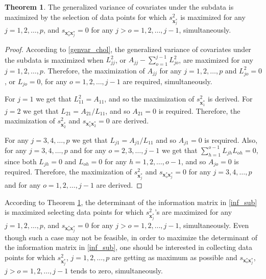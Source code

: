 \documentclass[12pt]{article}
\theoremstyle{definition}
\newtheorem{theorem}{Theorem}[section]
\begin{document}
	\begin{theorem}\label{theorem}
		The generalized variance of covariates under the subdata is maximized by the selection of data points for which $s_{\textbf{x}_j^*}^2$ is maximized for any $j=1,2,\ldots,p$, and $s_{\textbf{x}_o^*\textbf{x}_j^*}=0$ for any $j>o=1,2,\ldots,j-1$, simultaneously.
	\end{theorem}
	\begin{proof}
		According to \eqref{genvar_chol}, the generalized variance of covariates under the subdata is maximized when $L_{jj}^2$, or $A_{jj}-\sum_{o=1}^{j-1}L_{jo}^2$, are maximized for any $j=1,2,\ldots,p$. Therefore, the maximization of $A_{jj}$ for any $j=1,2,\ldots,p$ and $L_{jo}^2=0$, or $L_{jo}=0$, for any $o=1,2,\ldots,j-1$ are required, simultaneously.
		
		For $j=1$ we get that $L_{11}^2=A_{11}$, and so the maximization of $s_{\textbf{x}_1^*}^2$ is derived. For $j=2$ we get that $L_{21}=A_{21}/L_{11}$, and so $A_{21}=0$ is required. Therefore, the maximization of $s_{\textbf{x}_2^*}^2$ and $s_{\textbf{x}_1^*\textbf{x}_2^*}=0$ are derived.
		
		For any $j=3,4,\ldots,p$ we get that $L_{j1}=A_{j1}/L_{11}$ and so $A_{j1}=0$ is required. Also, for any $j=3,4,\ldots,p$ and for any $o=2,3,\ldots,j-1$ we get that $\sum_{h=1}^{o-1}L_{jh}L_{oh}=0$, since both $L_{jh}=0$ and $L_{oh}=0$ for any $h=1,2,\ldots,o-1$, and so $A_{jo}=0$ is required. Therefore, the maximization of $s_{\textbf{x}_j^*}^2$ and $s_{\textbf{x}_o^*\textbf{x}_j^*}=0$ for any $j=3,4,\ldots,p$ and for any $o=1,2,\ldots,j-1$ are derived.
	\end{proof}
	According to Theorem \ref{theorem}, the determinant of the information matrix in \eqref{inf_sub} is maximized selecting data points for which $s_{\textbf{x}_j^*}^2$'s are maximized  for any $j=1,2,\ldots,p$, and $s_{\textbf{x}_o^*\textbf{x}_j^*}=0$ for any $j>o=1,2,\ldots,j-1$, simultaneously. Even though such a case may not be feasible, in order to maximize the determinant of the information matrix in \eqref{inf_sub}, one should be interested in collecting data points for which $s_{\textbf{x}_j^*}^2$, $j=1,2,\ldots,p$ are getting as maximum as possible and $s_{\textbf{x}_o^*\textbf{x}_j^*}$, $j>o=1,2,\ldots,j-1$ tends to zero, simultaneously.
	
\end{document}
